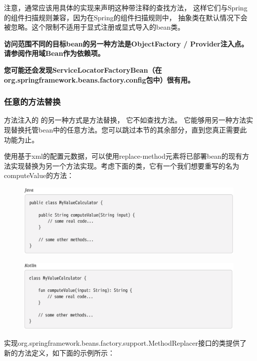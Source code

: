 注意，通常应该用具体的实现来声明这种带注释的查找方法，
这样它们与Spring的组件扫描规则兼容，因为在Spring的组件扫描规则中，
抽象类在默认情况下会被忽略。这个限制不适用于显式注册或显式导入的bean类。

\textbf{访问范围不同的目标bean的另一种方法是ObjectFactory / Provider注入点。 请参阅作用域Bean作为依赖项。}

\textbf{您可能还会发现ServiceLocatorFactoryBean（在org.springframework.beans.factory.config包中）很有用。}
\subsubsection{任意的方法替换}

方法注入的
的另一种方式是方法替换，
它不如查找方法。
它能够用另一种方法实现替换托管bean中的任意方法。您可以跳过本节的其余部分，直到您真正需要此功能为止。

\newpage
使用基于xml的配置元数据，可以使用replace-method元素将已部署bean的现有方法实现替换为另一个方法实现。考虑下面的类，它有一个我们想要重写的名为computeValue的方法：

\begin{figure}[ht]
    \centering
    \includegraphics[width=1\linewidth]{./Figure/68.png}
\end{figure}



\begin{figure}[ht]
    \centering
    \includegraphics[width=1\linewidth]{./Figure/69.png}
\end{figure}

\newpage
实现org.springframework.beans.factory.support.MethodReplacer接口的类提供了新的方法定义，如下面的示例所示：


